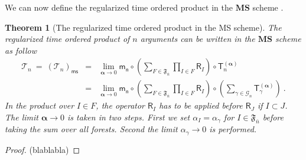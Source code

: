\documentclass[11pt]{book}
\newcommand{\ms}{\mathsf{ms}}
\newcommand{\MS}{\textbf{MS}}
\newcommand{\alphabd}{\boldsymbol{\alpha}}
\newcommand{\Gcal}{\mathcal{G}}
\newcommand{\Tcal}{\mathcal{T}}
\newcommand{\Frak}{\mathfrak{F}}
\newcommand{\Rsf}{\mathsf{R}}
\newcommand{\Tsf}{\mathsf{T}}
\newcommand{\msf}{\mathsf{m}}
\newcommand{\nsf}{\mathsf{n}}
\theoremstyle{break}
\newtheorem{theorem}{Theorem}[chapter]
\begin{document}
We can now define the regularized time ordered product in the $\MS$ scheme \cite{duetsch_dimensional_2014}.


\begin{theorem}[The regularized time ordered product in the MS scheme] \label{theo:renorm_t_prod_ms_forest}
The regularized time ordered product of $n$ arguments can be written in the $\MS$ scheme as follow
%
\begin{eqnarray}
\Tcal_n \ = \ \left(\Tcal_n\right)_\ms &=& \lim_{\alphabd \to 0} \msf_\nsf \circ \left( \sum_{F\in\Frak_{\overline{n}}} \prod_{I\in F} \Rsf_I \right) \circ \Tsf^{(\alphabd)}_n \nonumber \\
&=& \lim_{\alphabd \to 0} \msf_\nsf \circ \left( \sum_{F\in\Frak_{\overline{n}}} \prod_{I\in F} \Rsf_I \right) \circ \left( \sum_{\gamma\in\Gcal_n} \Tsf_{\gamma}^{(\alphabd)} \right) \ .
\label{eq:ms_t_forest}
\end{eqnarray}
%
In the product over $I\in F$, the operator $\Rsf_I$ has to be applied before $\Rsf_J$ if $I\subset J$.
%
The limit $\alphabd \to 0$ is taken in two steps. First we set $\alpha_{I}= \alpha_\gamma$ for $I \in \Frak_{\bar{n}}$ before taking the sum over all forests. Second the limit $\alpha_\gamma \to 0$ is performed.
\end{theorem}


\begin{proof}
(blablabla)
\end{proof}
\end{document}
